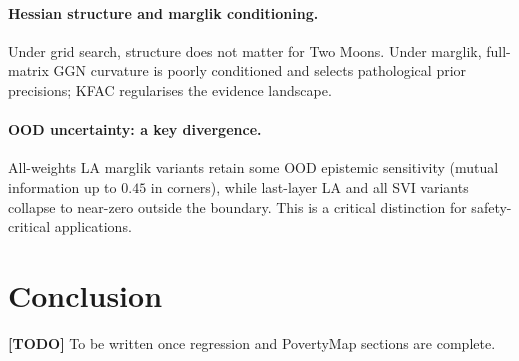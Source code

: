 \documentclass[12pt,a4paper]{article}
\newcommand{\todo}[1]{\noindent\colorbox{yellow!40}{\parbox{\dimexpr\linewidth-2\fboxsep}{\textbf{[TODO]} #1}}}
\begin{document}
\paragraph{Hessian structure and marglik conditioning.}
Under grid search, structure does not matter for Two Moons.
Under marglik, full-matrix GGN curvature is poorly conditioned and selects
pathological prior precisions; KFAC regularises the evidence landscape.

\paragraph{OOD uncertainty: a key divergence.}
All-weights LA marglik variants retain some OOD epistemic sensitivity
(mutual information up to $0.45$ in corners), while last-layer LA
and all SVI variants collapse to near-zero outside the boundary.
This is a critical distinction for safety-critical applications.

\section{Conclusion}
\label{sec:conclusion}

\todo{To be written once regression and PovertyMap sections are complete.}

\appendix




\end{document}

